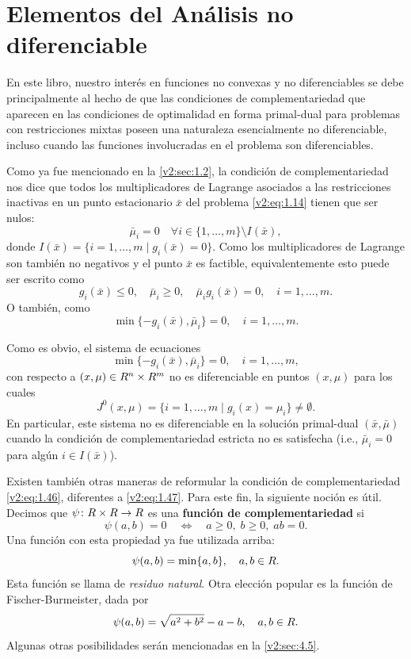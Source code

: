 
\section{Elementos del Análisis no diferenciable}
\label{v2:sec:1.6}

En este libro, nuestro interés en funciones no convexas y no diferenciables se debe principalmente al hecho de que las condiciones de complementariedad que aparecen en las condiciones de optimalidad en forma primal-dual para problemas con restricciones mixtas poseen una naturaleza esencialmente no diferenciable, incluso cuando las funciones involucradas en el problema son diferenciables.

Como ya fue mencionado en la \cref{v2:sec:1.2}, la condición de complementariedad nos dice que todos los multiplicadores de Lagrange asociados a las restricciones inactivas en un punto estacionario $\bar{x}$ del problema \eqref{v2:eq:1.14} tienen que ser nulos:
\[
    \bar{\mu}_i = 0 \quad \forall i \in \{1, \dots, m\} \setminus I(\bar{x}),
\]
donde $I(\bar{x}) = \{i = 1, \dots, m \mid g_i(\bar{x}) = 0\}$. Como los multiplicadores de Lagrange son también no negativos y el punto $\bar{x}$ es factible, equivalentemente esto puede ser escrito como
\begin{equation}
    g_i(\bar{x}) \le 0, \quad \bar{\mu}_i \ge 0, \quad \bar{\mu}_i g_i(\bar{x}) = 0, \quad i = 1, \dots, m.
    \label{v2:eq:1.46}
\end{equation}
O también, como
\[
    \min\{-g_i(\bar{x}), \bar{\mu}_i\} = 0, \quad i = 1, \dots, m.
\]

Como es obvio, el sistema de ecuaciones
\begin{equation}
    \min\{-g_i(\bar{x}), \bar{\mu}_i\} = 0, \quad i = 1, \dots, m,
    \label{v2:eq:1.47}
\end{equation}
con respecto a $(x, \mu) \in R^n \times R^m$ no es diferenciable en puntos $(x, \mu)$ para los cuales
\[
    J^0(x, \mu) = \{i = 1, \dots, m \mid g_i(x) = \mu_i\} \neq \emptyset.
\]
En particular, este sistema no es diferenciable en la solución primal-dual $(\bar{x}, \bar{\mu})$ cuando la condición de complementariedad estricta no es satisfecha (i.e., $\bar{\mu}_i = 0$ para algún $i \in I(\bar{x})$).

Existen también otras maneras de reformular la condición de complementariedad \eqref{v2:eq:1.46}, diferentes a \eqref{v2:eq:1.47}. Para este fin, la siguiente noción es útil.
Decimos que $\psi \colon R \times R \to R$ es una \textbf{función de complementariedad} si
\[
    \psi(a, b) = 0 \quad \iff \quad a \ge 0, \; b \ge 0, \; ab = 0.
\]
Una función con esta propiedad ya fue utilizada arriba:
\[
    \psi(a, b) = \min\{a, b\}, \quad a, b \in R.
\]
Esta función se llama de \textit{residuo natural}. Otra elección popular es la función de Fischer-Burmeister, dada por
\[
    \psi(a, b) = \sqrt{a^2 + b^2} - a - b, \quad a, b \in R.
\]
Algunas otras posibilidades serán mencionadas en la \cref{v2:sec:4.5}.

